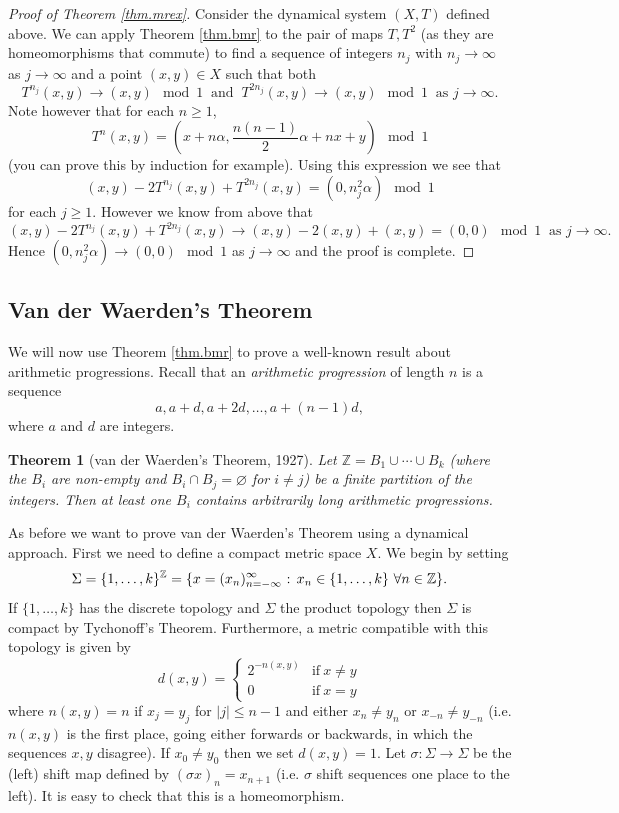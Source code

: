 \documentclass[12pt]{article}
\newtheorem{theorem}{Theorem}[section]
\theoremstyle{definition}
\theoremstyle{remark}
\begin{document}
\begin{proof}[Proof of Theorem \ref{thm.mrex}]
Consider the dynamical system $(X,T)$ defined above. We can apply Theorem \ref{thm.bmr} to the pair of maps $T, T^2$ (as they are homeomorphisms that commute) to find a sequence of integers $n_j$ with $n_j \to \infty$ as $j\to\infty$ and a point $(x,y) \in X$ such that both
\[
T^{n_j}(x,y) \to (x,y) \mod 1 \ \text{ and } \ T^{2n_j}(x,y) \to (x,y) \mod 1\ \text{ as $j\to\infty$.}
\]
Note however that for each $n \ge 1$,
\[
T^n(x,y) = \left(x+n\alpha, \frac{n(n-1)}{2}\alpha + nx + y\right) \mod 1
\]
(you can prove this by induction for example). Using this expression we see that
\[
(x,y) - 2T^{n_j}(x,y) + T^{2n_j}(x,y) = (0, n_j^2 \alpha) \mod 1
\]
for each $j \ge 1$. However we know from above that
\[
(x,y) - 2T^{n_j}(x,y) + T^{2n_j}(x,y)  \to (x,y) - 2(x,y) + (x,y) = (0,0) \mod 1 \ \text{ as $j\to\infty$.}
\]
Hence $(0, n_j^2 \alpha) \to (0,0) \mod 1$ as $j \to \infty$ and the proof is complete.
\end{proof}




\subsection{Van der Waerden's Theorem}
We will now use Theorem \ref{thm.bmr} to prove a well-known result about arithmetic progressions.
\medskip
Recall that an {\it arithmetic progression} of length $n$ is a sequence
\[
a, a+d,a+2d,\ldots,a+(n-1)d,
\]
where $a$ and $d$ are integers.

\begin{theorem}[van der Waerden's Theorem, 1927] \label{vdwaerden_th}
Let $\mathbb Z = B_1 \cup \cdots \cup B_k$ (where the $B_i$ are non-empty and $B_i \cap B_j =\varnothing$ for $i \ne j$) be a finite partition of the integers.
Then at least one $B_i$ contains arbitrarily long arithmetic progressions.
\end{theorem}
As before we want to prove van der Waerden's Theorem using a dynamical approach. 
First we need to define a compact metric space $X$.
We begin by setting  
\[
\Sigma =\{1,\ldots,k\}^{\mathbb Z}
= \{x = (x_n)_{n=-\infty}^\infty \hbox{ : } x_n \in \{1,\ldots,k\} \ \forall n\in \mathbb Z\}.
\]
If $\{1,\ldots,k\}$ has the discrete topology and $\Sigma$ the product topology then $\Sigma$ is compact by Tychonoff's 
Theorem. Furthermore, a metric compatible with this topology is given by 
\[
d( x,y) =
\begin{cases} 
2^{-n(x,y)} & \text{if}\ x \not=y \\
 0 & \text{if} \ x=y
 \end{cases}
 \]
 where
$n(x,y) =n$ if $x_{j} = y_{j}$ for $|j| \leq n-1$ and either $x_{n} \not= y_{n}$ or $x_{-n} \not= y_{-n}$ 
(i.e. $n(x,y)$ is the first place, going either forwards or backwards, in which the sequences $x,y$ disagree).
If $x_0 \neq y_0$ then we set $d(x,y) =1$.
Let $\sigma : \Sigma \to \Sigma$ be the (left) shift map defined by
$(\sigma x)_n = x_{n+1}$ (i.e. $\sigma$ shift sequences one place to the left). It is easy to check that this is a homeomorphism.
\end{document}
